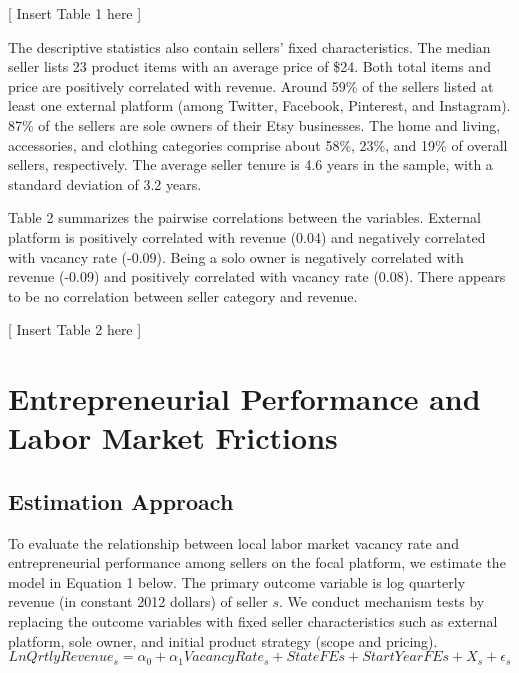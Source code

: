 \documentclass[letterpaper,12pt]{article}
\begin{document}
\begin{center}
    [ Insert Table 1 here ]
\end{center}

The descriptive statistics also contain sellers' fixed characteristics. The median seller lists 23 product items with an average price of \$24. Both total items and price are positively correlated with revenue. Around 59\% of the sellers listed at least one external platform (among Twitter, Facebook, Pinterest, and Instagram). 87\% of the sellers are sole owners of their Etsy businesses. The home and living, accessories, and clothing categories comprise about 58\%, 23\%, and 19\% of overall sellers, respectively. The average seller tenure is 4.6 years in the sample, with a standard deviation of 3.2 years.

Table 2 summarizes the pairwise correlations between the variables. External platform is positively correlated with revenue (0.04) and negatively correlated with vacancy rate (-0.09). Being a solo owner is negatively correlated with revenue (-0.09) and positively correlated with vacancy rate (0.08). There appears to be no correlation between seller category and revenue.

\begin{center}
    [ Insert Table 2 here ]
\end{center}

\section{Entrepreneurial Performance and Labor Market Frictions}


\subsection{Estimation Approach} \label{sec:h1}

To evaluate the relationship between local labor market vacancy rate and entrepreneurial performance among sellers on the focal platform, we estimate the model in Equation 1 below. The primary outcome variable is log quarterly revenue (in constant 2012 dollars) of seller $s$. We conduct mechanism tests by replacing the outcome variables with fixed seller characteristics such as external platform, sole owner, and initial product strategy (scope and pricing).
\begin{equation} \label{eq:h1}
LnQrtlyRevenue_{s}=\alpha_{0} + \alpha_{1}VacancyRate_{s}+State FEs+ StartYear FEs+X_{s}+\epsilon_{s}
\end{equation}
\end{document}
